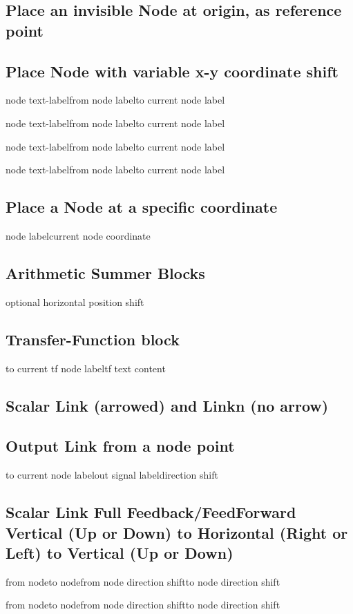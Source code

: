 \documentclass[onecolumn,a4paper,10pt]{IEEEtran}
\newcommand*{\spacetweak}{\medskip\medskip}
\newenvironment{apilist}{
	\vspace{1ex}}%
{\vspace{1em}}
\newcommand{\cvhd}[1]{{
		{\subsection{#1}}{\mbox{}\break}\vspace{-5ex}
}}
\begin{document}
\begin{apilist}
\cvhd{Place an invisible Node at origin, as reference point}
\begin{cvl}
\end{cvl}

\cvhd{Place Node with variable x-y coordinate shift}
\begin{cvl}
{node text-label}{from node label}{to current node label}

{node text-label}{from node label}{to current node label}

{node text-label}{from node label}{to current node label}

{node text-label}{from node label}{to current node label}
\end{cvl}
	
\cvhd{Place a Node at a specific coordinate}
\begin{cvl}
{node label}{current node coordinate}
\end{cvl}

\cvhd{Arithmetic Summer Blocks}
\begin{cvl}
{optional horizontal position shift}
\end{cvl}

\cvhd{Transfer-Function block}
\begin{cvl}
{to current tf node label}{tf text content}
\end{cvl}

\cvhd{Scalar Link (arrowed) and Linkn (no arrow)}
\begin{cvl}

\end{cvl}


\cvhd{Output Link from a node point}
\begin{cvl}
{to current node label}{out signal label}{direction shift}
\end{cvl}


\cvhd{Scalar Link Full Feedback/FeedForward Vertical (Up or Down) to Horizontal (Right or Left) to Vertical (Up or Down)}
\begin{cvl}
{from node}{to node}{from node direction shift}{to node direction shift}

{from node}{to node}{from node direction shift}{to node direction shift}
\end{cvl}





\end{apilist}
\spacetweak
\end{document}
